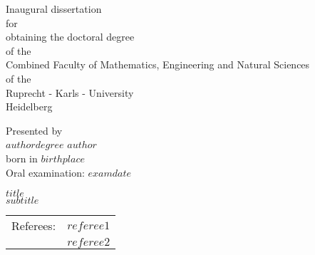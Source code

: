 \documentclass[11pt, a4paper, twosided]{book}
\begin{document}

\thispagestyle{empty}
  \begin{center}
  {\Large{Inaugural dissertation\\
    for\\
    obtaining the doctoral degree\\
    of the\\
    Combined Faculty of Mathematics, Engineering and Natural Sciences\\
    of the\\
    Ruprecht - Karls - University\\
    Heidelberg\\}} \vspace*{\fill}

  \Large{Presented by} \\\vspace{0.5cm}
  \Large{$authordegree$ $author$} \\
  \Large{born in $birthplace$} \\
  \Large{Oral examination: $examdate$}

\end{center}
\newpage\null\thispagestyle{empty}\newpage


\pagebreak
\thispagestyle{empty}
\null
\begin{center}
\Large{$title$} \\
\large{$subtitle$} \\
\vspace*{\fill}
\begin{tabular}{ c c }
Referees: & $referee1$ \\
          & $referee2$
\end{tabular}
\end{center}
\newpage\null\thispagestyle{empty}\newpage

\end{document}
